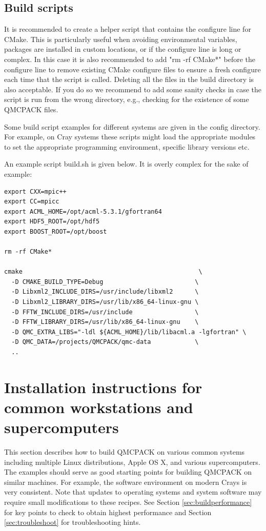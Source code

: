 \subsection{Build scripts}
It is recommended to create a helper script that contains the
configure line for CMake.  This is particularly useful when avoiding
environmental variables, packages are installed in custom locations,
or if the configure line is long or complex.  In this case it is also
recommended to add "rm -rf CMake*" before the configure line to remove
existing CMake configure files to ensure a fresh configure each time
that the script is called. Deleting all the files in the build
directory is also acceptable. If you do so we recommend to add some sanity
checks in case the script is run from the wrong directory, e.g.,
checking for the existence of some QMCPACK files.

Some build script examples for different systems are given in the
config directory. For example, on Cray systems these scripts might
load the appropriate modules to set the appropriate programming
environment, specific library versions etc.

An example script build.sh is given below. It is overly complex for
the sake of example:

\begin{verbatim}
export CXX=mpic++
export CC=mpicc
export ACML_HOME=/opt/acml-5.3.1/gfortran64
export HDF5_ROOT=/opt/hdf5
export BOOST_ROOT=/opt/boost

rm -rf CMake*

cmake                                                \
  -D CMAKE_BUILD_TYPE=Debug                         \
  -D Libxml2_INCLUDE_DIRS=/usr/include/libxml2      \
  -D Libxml2_LIBRARY_DIRS=/usr/lib/x86_64-linux-gnu \
  -D FFTW_INCLUDE_DIRS=/usr/include                 \
  -D FFTW_LIBRARY_DIRS=/usr/lib/x86_64-linux-gnu    \
  -D QMC_EXTRA_LIBS="-ldl ${ACML_HOME}/lib/libacml.a -lgfortran" \
  -D QMC_DATA=/projects/QMCPACK/qmc-data            \
  ..
\end{verbatim}

\section{Installation instructions for common workstations and
  supercomputers}
\label{sec:installexamples}

This section describes how to build QMCPACK on various common systems
including multiple Linux distributions, Apple OS X, and various
supercomputers. The examples should serve as good starting points for
building QMCPACK on similar machines. For example, the software
environment on modern Crays is very consistent. Note that updates to
operating systems and system software may require small modifications
to these recipes. See Section \ref{sec:buildperformance} for key
points to check to obtain highest performance and
Section \ref{sec:troubleshoot} for troubleshooting hints.

